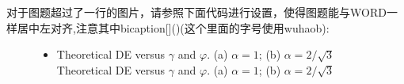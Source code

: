 对于图题超过了一行的图片，请参照下面代码进行设置，使得图题能与WORD一样居中左对齐,注意其中bicaption[]()(这个里面的字号使用wuhaob):
\vspace{0.3cm}
\begin{figure}[!h]
	\centering
	\begin{itemize}[leftmargin=1.6cm,rightmargin=1.6cm]
		\item[\quad] 
		{\wuhaob Theoretical DE versus $\gamma$ and $\varphi$. (a) $\alpha=1$; (b) $\alpha=2/\sqrt{3}$Theoretical DE versus $\gamma$ and $\varphi$. (a) $\alpha=1$; (b) $\alpha=2/\sqrt{3}$}
	\end{itemize}
\vspace{-1cm}




\end{figure}



